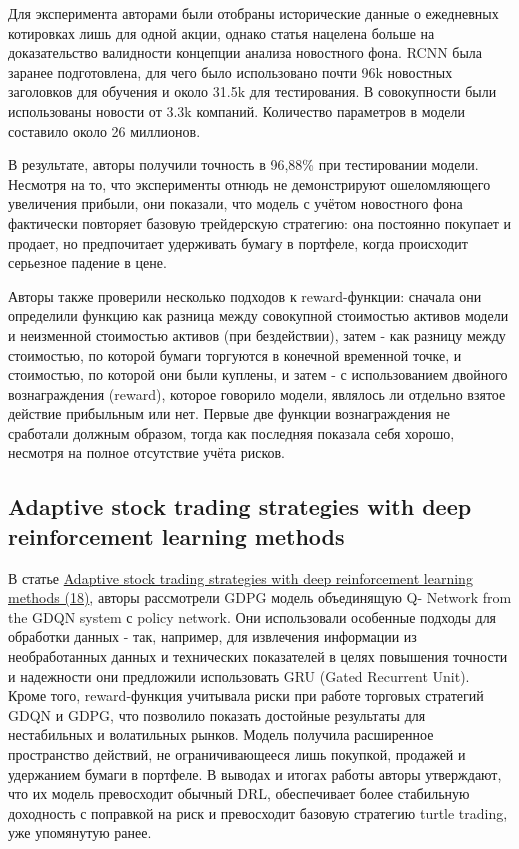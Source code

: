 \documentclass[a4paper,14pt]{extarticle}
\newcommand{\bibref}[3]{\hyperlink{#1}{#2 (#3)}} %
\begin{document}
Для эксперимента авторами были отобраны исторические данные о ежедневных котировках лишь для одной акции, однако статья нацелена больше на доказательство валидности концепции анализа новостного фона. RCNN была заранее подготовлена, для чего было использовано почти 96k новостных заголовков для обучения и около 31.5k для тестирования. В совокупности были использованы новости от 3.3k компаний. Количество параметров в модели составило около 26 миллионов.

В результате, авторы получили точность в 96,88\% при тестировании модели. Несмотря на то, что эксперименты отнюдь не демонстрируют ошеломляющего увеличения прибыли, они показали, что модель с учётом новостного фона фактически повторяет базовую трейдерскую стратегию: она постоянно покупает и продает, но предпочитает удерживать бумагу в портфеле, когда происходит серьезное падение в цене. 

Авторы также проверили несколько подходов к reward-функции: сначала они определили функцию как разница между совокупной стоимостью активов модели и неизменной стоимостью активов (при бездействии), затем - как разницу между стоимостью, по которой бумаги торгуются в конечной временной точке, и стоимостью, по которой они были куплены, и затем - с использованием двойного вознаграждения (reward), которое говорило модели, являлось ли отдельно взятое действие прибыльным или нет. Первые две функции вознаграждения не сработали должным образом, тогда как последняя показала себя хорошо, несмотря на полное отсутствие учёта рисков.

\subsection{Adaptive stock trading strategies with deep reinforcement learning methods}

В статье \bibref{18}{Adaptive stock trading strategies with deep reinforcement learning methods}{18}, авторы рассмотрели GDPG  модель объединящую Q- Network from the GDQN system с policy network. Они использовали особенные подходы для обработки данных - так, например, для извлечения информации из необработанных данных и технических показателей в целях повышения точности и надежности они предложили использовать GRU (Gated Recurrent Unit). Кроме того, reward-функция учитывала риски при работе торговых стратегий GDQN и GDPG, что позволило показать достойные результаты для нестабильных и волатильных рынков. Модель получила расширенное пространство действий, не ограничивающееся лишь покупкой, продажей и удержанием бумаги в портфеле. В выводах и итогах работы авторы утверждают, что их модель превосходит обычный DRL, обеспечивает более стабильную доходность с поправкой на риск и превосходит базовую стратегию turtle trading, уже упомянутую ранее.
\end{document}

